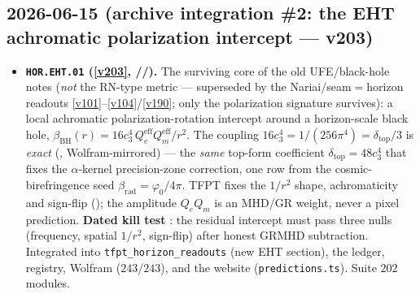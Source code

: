 \subsection*{2026-06-15 (archive integration \#2: the EHT achromatic polarization intercept --- v203)}
\begin{itemize}
\item \textbf{\texttt{HOR.EHT.01} (\vref{v203}, \mE/\mC/\mX).} The surviving core of the old UFE/black-hole
  notes (\emph{not} the RN-type metric --- superseded by the Nariai/seam$=$horizon readouts
  \vref{v101}--\vref{v104}/\vref{v190}; only the polarization signature survives): a local achromatic
  polarization-rotation intercept around a horizon-scale black hole,
  $\beta_{\mathrm{BH}}(r)=16c_3^4\,Q_e^{\mathrm{eff}}Q_m^{\mathrm{eff}}/r^2$. The coupling
  $16c_3^4=1/(256\pi^4)=\delta_{\mathrm{top}}/3$ is \emph{exact} (\mE, Wolfram-mirrored) --- the \emph{same}
  top-form coefficient $\delta_{\mathrm{top}}=48c_3^4$ that fixes the $\alpha$-kernel precision-zone
  correction, one row from the cosmic-birefringence seed $\beta_{\mathrm{rad}}=\varphi_0/4\pi$. TFPT fixes the
  $1/r^2$ shape, achromaticity and sign-flip (\mC); the amplitude $Q_eQ_m$ is an MHD/GR weight, never a
  pixel prediction. \textbf{Dated kill test \mX}: the residual intercept must pass three nulls (frequency,
  spatial $1/r^2$, sign-flip) after honest GRMHD subtraction. Integrated into \texttt{tfpt\_horizon\_readouts}
  (new EHT section), the ledger, registry, Wolfram ($243/243$), and the website (\texttt{predictions.ts}).
  Suite $202$ modules.
\end{itemize}

